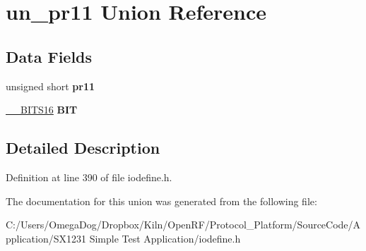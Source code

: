 \hypertarget{unionun__pr11}{\section{un\-\_\-pr11 Union Reference}
\label{unionun__pr11}
}
\subsection*{Data Fields}
\begin{DoxyCompactItemize}
\item 
\hypertarget{unionun__pr11_a61b39e145e8ac2f2cbaa4ebcc2d2a2ae}{unsigned short {\bfseries pr11}}\label{unionun__pr11_a61b39e145e8ac2f2cbaa4ebcc2d2a2ae}

\item 
\hypertarget{unionun__pr11_a58d179e185f8b4c8d128381d900abc6a}{\hyperlink{struct_____b_i_t_s16}{\-\_\-\-\_\-\-B\-I\-T\-S16} {\bfseries B\-I\-T}}\label{unionun__pr11_a58d179e185f8b4c8d128381d900abc6a}

\end{DoxyCompactItemize}


\subsection{Detailed Description}


Definition at line 390 of file iodefine.\-h.



The documentation for this union was generated from the following file\-:\begin{DoxyCompactItemize}
\item 
C\-:/\-Users/\-Omega\-Dog/\-Dropbox/\-Kiln/\-Open\-R\-F/\-Protocol\-\_\-\-Platform/\-Source\-Code/\-Application/\-S\-X1231 Simple Test Application/iodefine.\-h\end{DoxyCompactItemize}
